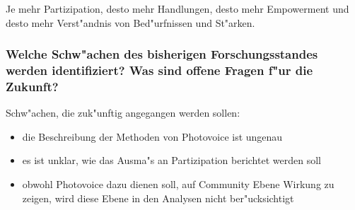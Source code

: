 Je mehr Partizipation, desto mehr Handlungen, desto mehr Empowerment und desto mehr Verst"andnis von Bed"urfnissen und St"arken.

\subsubsection{Welche Schw"achen des bisherigen Forschungsstandes werden identifiziert? Was sind offene Fragen f"ur die Zukunft?}
Schw"achen, die zuk"unftig angegangen werden sollen:
\begin{itemize}
        \item die Beschreibung der Methoden von Photovoice ist ungenau
        \item es ist unklar, wie das Ausma"s an Partizipation berichtet werden soll
        \item obwohl Photovoice dazu dienen soll, auf Community Ebene Wirkung zu zeigen, wird diese Ebene in den Analysen nicht ber"ucksichtigt
\end{itemize}
